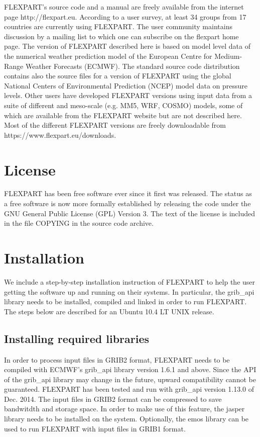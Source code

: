 \documentclass{egu}                  %
\begin{document}
FLEXPART's source code and a manual are freely available from the internet page
http://flexpart.eu. According to a user survey, at least 34 groups from 17 countries are currently using FLEXPART.  The user community
maintains discussion by a mailing list to which one can subscribe on the
flexpart home page.  The version of FLEXPART described here is based on model 
level data of the numerical weather prediction model of the European Centre for
Medium-Range Weather Forecasts (ECMWF).  The standard source code distribution
contains also the source files for a version of FLEXPART using the global
National Centers of Environmental Prediction (NCEP) model data on pressure
levels.  Other users have developed FLEXPART versions using input data from a
suite of different and meso-scale (e.g.  MM5, WRF, COSMO) models, some of which
are available from the FLEXPART website but are not described here. Most of the different FLEXPART versions are freely downloadable from https://www.flexpart.eu/downloads.

\section{License}

FLEXPART has been free software ever since it first was released. The status as
a free software is now more formally established by releasing the code under
the GNU General Public License (GPL) Version 3.  The text of the license is
included in the file COPYING in the source code archive.

\section{Installation}\label{sec:installation}

We include a step-by-step installation instruction of FLEXPART to help the user getting the software up and running on their systems. In particular, the grib\_api library needs to be installed, compiled and linked in order to run FLEXPART. The steps below are described for an Ubuntu 10.4 LT
UNIX release.

\subsection{Installing required libraries}

In order to process input files in GRIB2 format, FLEXPART needs to be
compiled with ECMWF's grib\_api library version 1.6.1 and above.  Since the API
of the grib\_api library may change in the future, upward compatibility cannot
be guaranteed. FLEXPART has been tested and run with grib\_api version 1.13.0 of Dec. 2014. The input files in GRIB2 format can be compressed to save
bandwitdth and storage space.  In order to make use of this feature, the jasper
library needs to be installed on the system.  Optionally, the emos library can
be used to run FLEXPART with input files in GRIB1 format.
\end{document}
